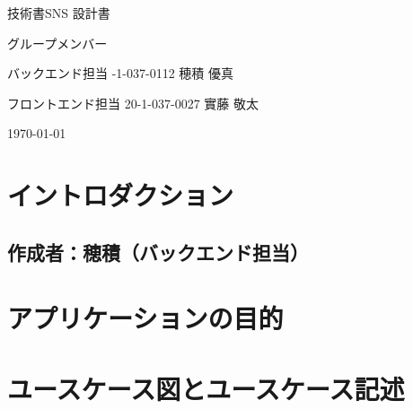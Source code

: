 \documentclass[dvipdfmx]{jsarticle}
\begin{document}
    \begin{titlepage}
        \begin{center}
            \vspace*{180truept}
            {\Huge 技術書SNS 設計書}

            \vspace{160truept}
            {\Large グループメンバー}

            \vspace{20truept}
            {\Large バックエンド担当 -1-037-0112 穂積 優真}

            \vspace{10truept}
            {\Large フロントエンド担当 20-1-037-0027 實藤 敬太}
            {\Large }

            \vspace{160truept}
            \today
        \end{center}
    \end{titlepage}
    \newpage

    \section*{イントロダクション}
    \subsection*{\rm{作成者：穂積（バックエンド担当）}}
    \section{アプリケーションの目的}
    \newpage

    \section*{ユースケース図とユースケース記述}
\end{document}
